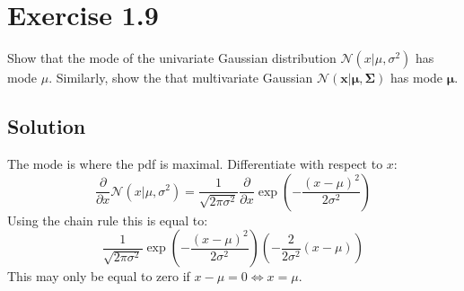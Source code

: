\documentclass[12pt, a4paper]{article}
\numberwithin{equation}{section}
\begin{document}
\section{Exercise 1.9}
Show that the mode of the univariate Gaussian distribution $\mathcal{N}(x|\mu,\sigma^2)$ has mode $\mu$. Similarly, show the that multivariate Gaussian $\mathcal{N}(\mathbf{x}|\mathbf{\mu},\mathbf{\Sigma})$ has mode $\mathbf{\mu}$.

\subsection{Solution}
The mode is where the pdf is maximal. Differentiate with respect to $x$:
\begin{equation}
\frac{\partial}{\partial x}\mathcal{N}(x|\mu,\sigma^2)=\frac{1}{\sqrt{2\pi\sigma^2}}\frac{\partial}{\partial x}\exp\left(-\frac{(x-\mu)^2}{2\sigma^2}\right)
\end{equation}
Using the chain rule this is equal to:
\begin{equation}
\frac{1}{\sqrt{2\pi\sigma^2}}\exp\left(-\frac{(x-\mu)^2}{2\sigma^2}\right)\left(-\frac{2}{2\sigma^2}(x-\mu)\right)
\end{equation}
This may only be equal to zero if $x-\mu=0\Leftrightarrow x=\mu$.
\end{document}
